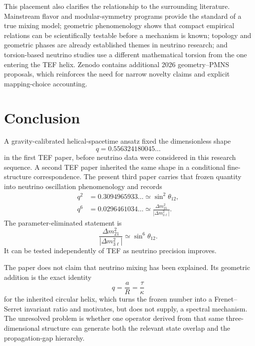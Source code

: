 \documentclass[10pt,twocolumn]{article}
\begin{document}
This placement also clarifies the relationship to the surrounding literature.
Mainstream flavor and modular-symmetry programs provide the standard of a true
mixing model; geometric phenomenology shows that compact empirical relations can
be scientifically testable before a mechanism is known; topology and geometric
phases are already established themes in neutrino research; and torsion-based
neutrino studies use a different mathematical torsion from the one entering the
TEF helix.  Zenodo contains additional 2026 geometry--PMNS proposals, which
reinforces the need for narrow novelty claims and explicit mapping-choice
accounting.

\section{Conclusion}

A gravity-calibrated helical-spacetime ansatz fixed the dimensionless shape
\begin{equation}
q=0.556324180045\ldots
\end{equation}
in the first TEF paper, before neutrino data were considered in this research
sequence.  A second TEF paper inherited the same shape in a conditional
fine-structure correspondence.  The present third paper carries that frozen
quantity into neutrino oscillation phenomenology and records
\begin{align}
q^2
&=0.3094965933\ldots
\simeq\sin^2\theta_{12},\\
q^6
&=0.0296461034\ldots
\simeq
\frac{\Delta m^2_{21}}{|\Delta m^2_{3\ell}|}.
\end{align}
The parameter-eliminated statement is
\begin{equation}
\boxed{
\frac{\Delta m^2_{21}}{|\Delta m^2_{3\ell}|}
\simeq
\sin^6\theta_{12}.
}
\end{equation}
It can be tested independently of TEF as neutrino precision improves.

The paper does not claim that neutrino mixing has been explained.  Its geometric
addition is the exact identity
\begin{equation}
q=\frac{a}{R}=\frac{\tau}{\kappa}
\end{equation}
for the inherited circular helix, which turns the frozen number into a
Frenet--Serret invariant ratio and motivates, but does not supply, a spectral
mechanism.  The unresolved problem is whether one operator derived from that same
three-dimensional structure can generate both the relevant state overlap and the
propagation-gap hierarchy.
\end{document}
